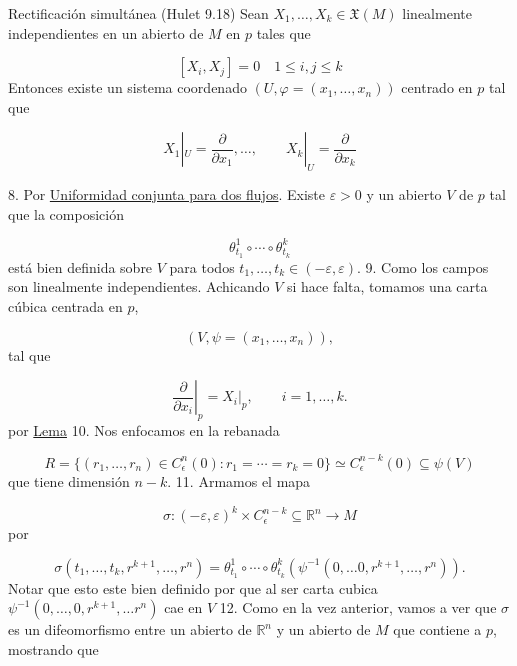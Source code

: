 \begin{bookproposition}{Rectificación simultánea (Hulet 9.18)}
Sean $X_1,\ldots,X_k\in\mathfrak X(M)$ linealmente independientes en un abierto de $M$ en $p$ tales que

\[
[X_{i},X_{j}]=0\quad 1\leq i,j\leq k
\]
Entonces existe un sistema coordenado $(U,\varphi=(x_1,\ldots,x_n))$ centrado en $p$ tal que

\[
X_1|_U=\frac{\partial}{\partial x_1},\ldots,\qquad X_k|_U=\frac{\partial}{\partial x_k}
\]
\end{bookproposition}
\begin{bookproof}{}
8. Por \hyperref[blk:39cc9a]{Uniformidad conjunta para dos flujos}. Existe $\varepsilon>0$ y un abierto $V$ de $p$ tal que la composición

\[
\theta^{1}_{t_1}\circ\cdots\circ\theta^k_{t_k}
\]
está bien definida sobre $V$ para todos $t_1,\ldots,t_k\in(-\varepsilon,\varepsilon)$. 9. Como los campos son linealmente independientes. Achicando $V$ si hace falta, tomamos una carta cúbica centrada en $p$,

\[
(V,\psi=(x_1,\ldots,x_n)),
\]
tal que

\[
\left.\frac{\partial}{\partial x_i}\right|_p=X_i|_p,\qquad i=1,\ldots,k.
\]
por \hyperref[blk:047506]{Lema} 10. Nos enfocamos en la rebanada

\[
R=\{(r_1,\ldots,r_n)\in C_{\epsilon}^{n} (0):r_1=\cdots=r_k=0\}\simeq C_{\epsilon}^{n-k} (0)\subseteq \psi(V)
\]
que tiene dimensión $n-k$. 11. Armamos el mapa

\[
\sigma:(-\varepsilon,\varepsilon)^k\times C_{\epsilon}^{n-k}\subseteq \mathbb{R}^{n}  \to M
\]
por

\[
\sigma(t_1,\ldots,t_k,r^{k+1},\ldots,r^{n}  )=\theta^1_{t_1}\circ\cdots\circ\theta^k_{t_k}(\psi^{-1}(0,\ldots 0,r^{k+1},\ldots,r^{n}  )).
\]
Notar que esto este bien definido por que al ser carta cubica $\psi ^{-1}(0,\ldots,0,r^{k+1},\ldots r^{n})$ cae en $V$ 12. Como en la vez anterior, vamos a ver que $\sigma$ es un difeomorfismo entre un abierto de $\mathbb{R}^n$ y un abierto de $M$ que contiene a $p$, mostrando que


\end{bookproof}
